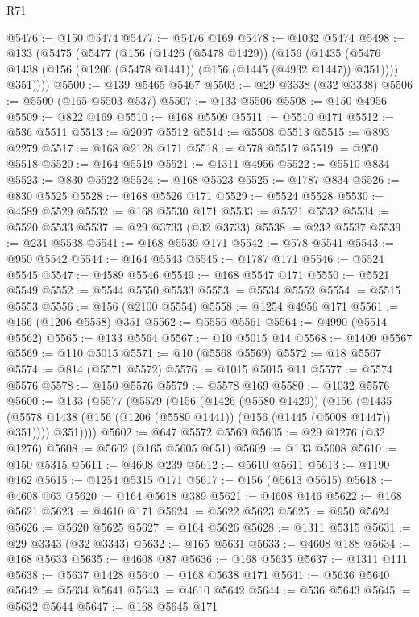 \begin{lexlean}{R71}
\begin{coremodule}
@5476 := @150 @5474
@5477 := @5476 @169
@5478 := @1032 @5474
@5498 := @133
    (@5475
      (@5477
        (@156
          (@1426 (@5478 @1429))
          (@156
            (@1435 (@5476 @1438 (@156 (@1206 (@5478 @1441)) (@156 (@1445 (@4932 @1447)) @351))))
            @351))))
@5500 := @139 @5465 @5467
@5503 := @29 @3338 (@32 @3338)
@5506 := @5500 (@165 @5503 @537)
@5507 := @133 @5506
@5508 := @150 @4956
@5509 := @822 @169
@5510 := @168 @5509
@5511 := @5510 @171
@5512 := @536 @5511
@5513 := @2097 @5512
@5514 := @5508 @5513
@5515 := @893 @2279
@5517 := @168 @2128 @171
@5518 := @578 @5517
@5519 := @950 @5518
@5520 := @164 @5519
@5521 := @1311 @4956
@5522 := @5510 @834
@5523 := @830 @5522
@5524 := @168 @5523
@5525 := @1787 @834
@5526 := @830 @5525
@5528 := @168 @5526 @171
@5529 := @5524 @5528
@5530 := @4589 @5529
@5532 := @168 @5530 @171
@5533 := @5521 @5532
@5534 := @5520 @5533
@5537 := @29 @3733 (@32 @3733)
@5538 := @232 @5537
@5539 := @231 @5538
@5541 := @168 @5539 @171
@5542 := @578 @5541
@5543 := @950 @5542
@5544 := @164 @5543
@5545 := @1787 @171
@5546 := @5524 @5545
@5547 := @4589 @5546
@5549 := @168 @5547 @171
@5550 := @5521 @5549
@5552 := @5544 @5550 @5533
@5553 := @5534 @5552
@5554 := @5515 @5553
@5556 := @156 (@2100 @5554)
@5558 := @1254 @4956 @171
@5561 := @156 (@1206 @5558) @351
@5562 := @5556 @5561
@5564 := @4990 (@5514 @5562)
@5565 := @133 @5564
@5567 := @10 @5015 @14
@5568 := @1409 @5567
@5569 := @110 @5015
@5571 := @10 (@5568 @5569)
@5572 := @18 @5567
@5574 := @814 (@5571 @5572)
@5576 := @1015 @5015 @11
@5577 := @5574 @5576
@5578 := @150 @5576
@5579 := @5578 @169
@5580 := @1032 @5576
@5600 := @133
    (@5577
      (@5579
        (@156
          (@1426 (@5580 @1429))
          (@156
            (@1435 (@5578 @1438 (@156 (@1206 (@5580 @1441)) (@156 (@1445 (@5008 @1447)) @351))))
            @351))))
@5602 := @647 @5572 @5569
@5605 := @29 @1276 (@32 @1276)
@5608 := @5602 (@165 @5605 @651)
@5609 := @133 @5608
@5610 := @150 @5315
@5611 := @4608 @239
@5612 := @5610 @5611
@5613 := @1190 @162
@5615 := @1254 @5315 @171
@5617 := @156 (@5613 @5615)
@5618 := @4608 @63
@5620 := @164 @5618 @389
@5621 := @4608 @146
@5622 := @168 @5621
@5623 := @4610 @171
@5624 := @5622 @5623
@5625 := @950 @5624
@5626 := @5620 @5625
@5627 := @164 @5626
@5628 := @1311 @5315
@5631 := @29 @3343 (@32 @3343)
@5632 := @165 @5631
@5633 := @4608 @188
@5634 := @168 @5633
@5635 := @4608 @87
@5636 := @168 @5635
@5637 := @1311 @111
@5638 := @5637 @1428
@5640 := @168 @5638 @171
@5641 := @5636 @5640
@5642 := @5634 @5641
@5643 := @4610 @5642
@5644 := @536 @5643
@5645 := @5632 @5644
@5647 := @168 @5645 @171

\end{coremodule}
\end{lexlean}
